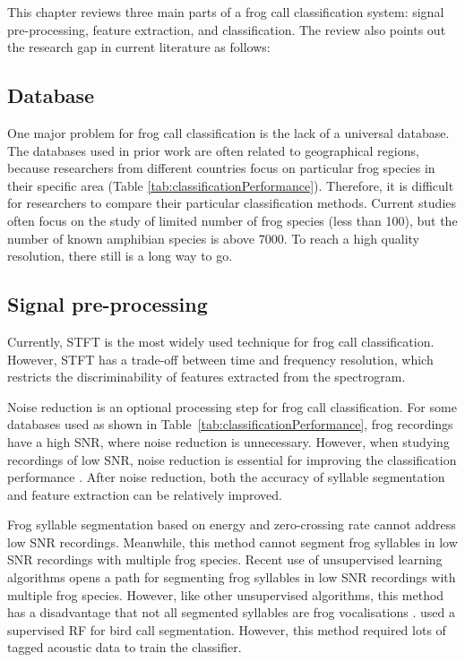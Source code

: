 This chapter reviews three main parts of a frog call classification system: signal pre-processing, feature extraction, and classification. The review also points out the research gap in current literature as follows:

\subsection{Database}
One major problem for frog call classification is the lack of a universal database. The databases used in prior work are often related to geographical regions, because researchers from different countries focus on particular frog species in their specific area (Table \ref{tab:classificationPerformance}). Therefore, it is difficult for researchers to compare their particular classification methods. Current studies often focus on the study of limited number of frog species (less than 100), but the number of known amphibian species is above 7000. To reach a high quality resolution, there still is a long way to go.


\subsection{Signal pre-processing}
Currently, STFT is the most widely used technique for frog call classification. However, STFT has a trade-off between time and frequency resolution, which restricts the discriminability of features extracted from the spectrogram. 

Noise reduction is an optional processing step for frog call classification. For some databases used as shown in Table~\ref{tab:classificationPerformance}, frog recordings have a high SNR, where noise reduction is unnecessary. However, when studying recordings of low SNR, noise reduction is essential for improving the classification performance \citep{bedoya2014automatic, Huang20141}. After noise reduction, both the accuracy of syllable segmentation and feature extraction can be relatively improved.

Frog syllable segmentation based on energy and zero-crossing rate cannot address low SNR recordings. Meanwhile, this method cannot segment frog syllables in low SNR recordings with multiple frog species. Recent use of unsupervised learning algorithms opens a path for segmenting frog syllables in low SNR recordings with multiple frog species. However, like other unsupervised algorithms, this method has a disadvantage that not all segmented syllables are frog vocalisations \citep{potamitis2015unsupervised}. \citep{briggs2012acoustic} used a supervised RF for bird call segmentation. However, this method required lots of tagged acoustic data to train the classifier.

